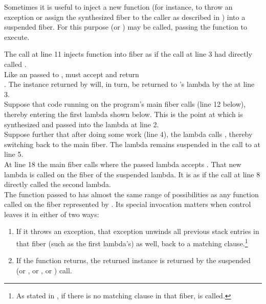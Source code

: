 \label{resumewith}
Sometimes it is useful to inject a new function (for instance, to throw an
exception or assign the synthesized fiber to the caller as described in
) into a suspended fiber. For this purpose
 (or \xtresumewith) may be called, passing the
function  to execute.

The \resumewith call at line 11 injects function  into
fiber  as if the \resume call at line 3 had directly
called .\\

Like an \entryfn passed to \fiber,  must accept
 and return\\
\fiber. The \fiber instance returned by  will, in turn, be returned
to 's lambda by the \resume at line 3.\\

Suppose that code running on the program's main fiber calls \resume (line 12 below), thereby
entering the first lambda shown below. This is the point at which  is
synthesized and passed into the lambda at line 2.\\
Suppose further that after doing some work (line 4), the lambda calls
, thereby switching back to the main fiber. The lambda remains
suspended in the call to  at line 5.\\
At line 18 the main fiber calls  where the passed lambda
accepts . That new lambda is called on the fiber of the suspended
lambda. It is as if the  call at line 8 directly called the second
lambda.\\

The function passed to \resumewith has almost the same range of possibilities as
any function called on the fiber represented by . Its special invocation
matters when control leaves it in either of two ways:

\begin{enumerate}
  \item If it throws an exception, that exception unwinds all previous stack
        entries in that fiber (such as the first lambda's) as well, back to
        a matching  clause.\footnote{As stated
        in , if there is no matching 
        clause in that fiber,  is called.}
  \item If the function returns, the returned \fiber instance is returned by
        the suspended  (or \resumewith, or \xtresume, or
        \xtresumewith) call.
\end{enumerate}

